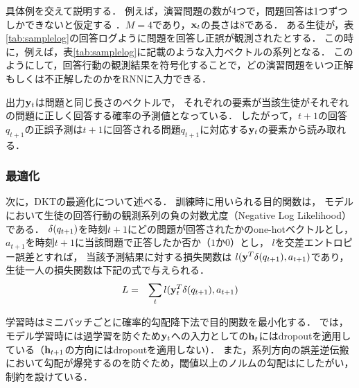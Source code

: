 具体例を交えて説明する．
例えば，演習問題の数が4つで，問題回答は1つずつしかできないと仮定する ．$M=4$であり，${\bf x}_t$の長さは$8$である．
ある生徒が，表\ref{tab:samplelog}の回答ログように問題を回答し正誤が観測されたとする．
この時に，例えば，表\ref{tab:samplelog}に記載のような入力ベクトルの系列となる．
このようにして，回答行動の観測結果を符号化することで，どの演習問題をいつ正解もしくは不正解したのかをRNNに入力できる．

出力${\bf y}_t$は問題と同じ長さのベクトルで，
それぞれの要素が当該生徒がそれぞれの問題に正しく回答する確率の予測値となっている．
したがって，$t+1$の回答$q_{t+1}$の正誤予測は$t+1$に回答される問題$q_{t+1}$に対応する${\bf y}_t$の要素から読み取れる．


\subsubsection{最適化}
次に，DKTの最適化について述べる．
訓練時に用いられる目的関数は，
モデルにおいて生徒の回答行動の観測系列の負の対数尤度（Negative Log Likelihood）である．
${\bf \delta}(q_{t+1})$を時刻$t+1$にどの問題が回答されたかのone-hotベクトルとし，
$a_{t+1}$を時刻$t+1$に当該問題で正答したか否か（$1$か$0$）とし，
$l$を交差エントロピー誤差とすれば，
当該予測結果に対する損失関数は $l({\bf y}^T {\bf \delta}(q_{t+1}), a_{t+1})$であり，
生徒一人の損失関数は下記の式で与えられる．
\begin{eqnarray}
L &=& \sum_t l({\bf y}_t^T {\bf \delta}(q_{t+1}), a_{t+1})
\end{eqnarray}


学習時はミニバッチごとに確率的勾配降下法で目的関数を最小化する．
\cite{piech2015deep}では，モデル学習時には過学習を防ぐため${\bf y}_t$への入力としての${\bf h}_t$にはdropout\cite{srivastava2014dropout}を適用している（${\bf h}_{t+1}$の方向にはdropoutを適用しない）．
また，系列方向の誤差逆伝搬\cite{werbos1990backpropagation}において勾配が爆発するのを防ぐため，閾値以上のノルムの勾配は\cite{pascanu2013difficulty}にしたがい，制約を設けている．


